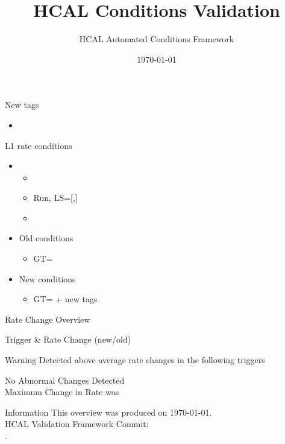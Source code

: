 \documentclass{beamer}
\title{HCAL Conditions Validation}
\author{HCAL Automated Conditions Framework}
\institute{CERN}
\date{\today}
\begin{document}
\frame{\titlepage}



\begin{frame}{New tags}
    \begin{itemize}
        \item {}
    \end{itemize}
\end{frame}


\begin{frame}{L1 rate conditions}
    \begin{itemize}
        \item {}
            \begin{itemize}
                \item {}
                \item Run, LS=[,]
                \item {}
            \end{itemize}
    \end{itemize}

    \begin{itemize}
        \item Old conditions
            \begin{itemize}
                \item GT=
            \end{itemize}
        \item New conditions
            \begin{itemize}
                \item GT= +  new tags
            \end{itemize}
     \end{itemize}
\end{frame}


\begin{frame}{Rate Change Overview}

\begin{center}
        Trigger & Rate Change (new/old) \\ \hline
          

    \begin{alertblock}{Warning}
        \large Detected above average rate changes in the following triggers\\
         
    \end{alertblock}
    \centering
    \Large No Abnormal Changes Detected \\
    Maximum Change in Rate was 
\end{center}

\end{frame}



\begin{frame}{Information}
    This overview was produced on \today.\\
    HCAL Validation Framework Commit: \\
    .
\end{frame}
\end{document}
